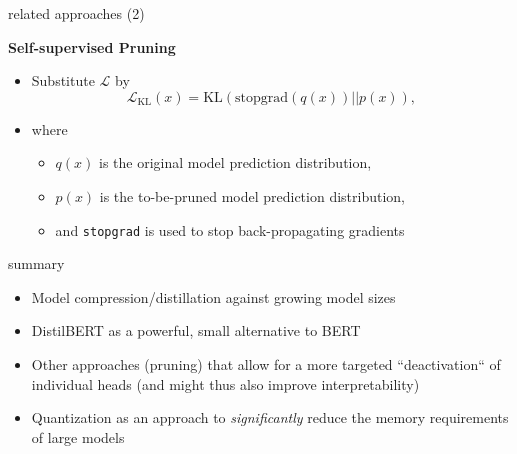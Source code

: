 \documentclass[11pt,compress,t,notes=noshow, xcolor=table]{beamer}
\begin{document}

\begin{frame}{related approaches (2)}

\vfill

\textbf{Self-supervised Pruning} 

\begin{itemize}
	\item Substitute $\mathcal{L}$ by
							$$\mathcal{L}_{\mathrm{KL}}(x)=\mathrm{KL}(\mathrm{stopgrad}(q(x))||p(x)),$$
	\item where
			\begin{itemize}
				\item $q(x)$ is the original model prediction distribution,
				\item $p(x)$ is the to-be-pruned model prediction distribution,
				\item and \texttt{stopgrad} is used to stop back-propagating gradients
			\end{itemize}
\end{itemize}

\vfill
	
\end{frame}


\begin{frame}{summary}

\vfill

\begin{itemize}
	\item Model compression/distillation against growing model sizes
	\item DistilBERT as a powerful, small alternative to BERT
	\item Other approaches (pruning) that allow for a more targeted ``deactivation`` of individual heads (and might thus also improve interpretability)
	\item Quantization as an approach to \textit{significantly} reduce the memory requirements of large models
\end{itemize}

\vfill
	
\end{frame}


\endlecture
\end{document}
